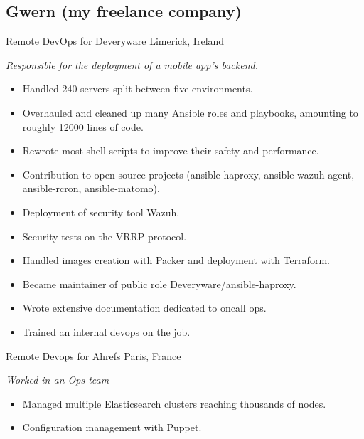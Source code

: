\documentclass[]{friggeri-cv} %
\begin{document}
\subsection{Gwern (my freelance company)}
\begin{entrylist}
 {Remote DevOps for Deveryware} {Limerick, Ireland} {
  \emph{Responsible for the deployment of a mobile app's backend.}
  \begin{itemize}
    \item Handled 240 servers split between five environments.
    \item Overhauled and cleaned up many Ansible roles and playbooks, amounting to roughly 12000 lines of code.
    \item Rewrote most shell scripts to improve their safety and performance.
    \item Contribution to open source projects (ansible-haproxy, ansible-wazuh-agent, ansible-rcron, ansible-matomo).
    \item Deployment of security tool Wazuh.
    \item Security tests on the VRRP protocol.
    \item Handled images creation with Packer and deployment with Terraform.
    \item Became maintainer of public role Deveryware/ansible-haproxy.
    \item Wrote extensive documentation dedicated to oncall ops.
    \item Trained an internal devops on the job.
  \end{itemize}
}
 {Remote Devops for Ahrefs} {Paris, France} {
  \emph{Worked in an Ops team}
  \begin{itemize}
    \item Managed multiple Elasticsearch clusters reaching thousands of nodes.
    \item Configuration management with Puppet.
  \end{itemize}
}
\end{entrylist}
\end{document}

